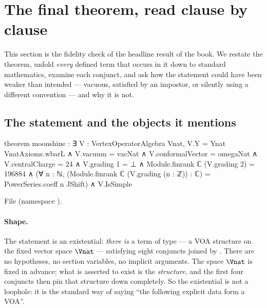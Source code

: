\section{The final theorem, read clause by clause}\label{ch14:sec:decode}

This section is the fidelity check of the headline result of the book.  We restate the theorem,
unfold \emph{every} defined term that occurs in it down to standard mathematics, examine each conjunct,
and ask how the statement could have been weaker than intended — vacuous, satisfied by an impostor, or
silently using a different convention — and why it is not.

\subsection{The statement and the objects it mentions}

\begin{leancode}
theorem moonshine :
    ∃ V : VertexOperatorAlgebra Vnat,
      V.Y = Ynat VnatAxioms.wbarL ∧ V.vacuum = vacNat ∧ V.conformalVector = omegaNat ∧
      V.centralCharge = 24 ∧
      V.grading 1 = ⊥ ∧
      Module.finrank ℂ (V.grading 2) = 196884 ∧
      (∀ n : ℕ, (Module.finrank ℂ (V.grading (n : ℤ)) : ℂ) = PowerSeries.coeff n JShift) ∧
      V.IsSimple
\end{leancode}
File  (namespace ).

\paragraph{Shape.}  The statement is an existential: \emph{there is} a term  of type
 — a VOA structure on the fixed vector space $\Vnat$ — satisfying eight
conjuncts joined by .  There are no hypotheses, no section variables, no implicit arguments.
The space $\Vnat$ is fixed in advance; what is asserted to exist is the \emph{structure}, and the first
four conjuncts then pin that structure down completely.  So the existential is not a
loophole: it is the standard way of saying ``the following explicit data form a VOA''.

